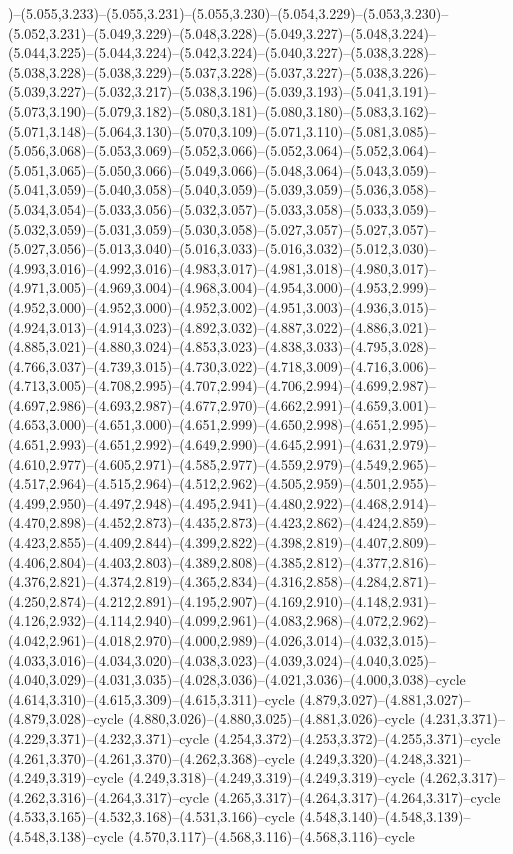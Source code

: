 )--(5.055,3.233)--(5.055,3.231)--(5.055,3.230)--(5.054,3.229)--(5.053,3.230)--(5.052,3.231)--(5.049,3.229)--(5.048,3.228)--(5.049,3.227)--(5.048,3.224)--(5.044,3.225)--(5.044,3.224)--(5.042,3.224)--(5.040,3.227)--(5.038,3.228)--(5.038,3.228)--(5.038,3.229)--(5.037,3.228)--(5.037,3.227)--(5.038,3.226)--(5.039,3.227)--(5.032,3.217)--(5.038,3.196)--(5.039,3.193)--(5.041,3.191)--(5.073,3.190)--(5.079,3.182)--(5.080,3.181)--(5.080,3.180)--(5.083,3.162)--(5.071,3.148)--(5.064,3.130)--(5.070,3.109)--(5.071,3.110)--(5.081,3.085)--(5.056,3.068)--(5.053,3.069)--(5.052,3.066)--(5.052,3.064)--(5.052,3.064)--(5.051,3.065)--(5.050,3.066)--(5.049,3.066)--(5.048,3.064)--(5.043,3.059)--(5.041,3.059)--(5.040,3.058)--(5.040,3.059)--(5.039,3.059)--(5.036,3.058)--(5.034,3.054)--(5.033,3.056)--(5.032,3.057)--(5.033,3.058)--(5.033,3.059)--(5.032,3.059)--(5.031,3.059)--(5.030,3.058)--(5.027,3.057)--(5.027,3.057)--(5.027,3.056)--(5.013,3.040)--(5.016,3.033)--(5.016,3.032)--(5.012,3.030)--(4.993,3.016)--(4.992,3.016)--(4.983,3.017)--(4.981,3.018)--(4.980,3.017)--(4.971,3.005)--(4.969,3.004)--(4.968,3.004)--(4.954,3.000)--(4.953,2.999)--(4.952,3.000)--(4.952,3.000)--(4.952,3.002)--(4.951,3.003)--(4.936,3.015)--(4.924,3.013)--(4.914,3.023)--(4.892,3.032)--(4.887,3.022)--(4.886,3.021)--(4.885,3.021)--(4.880,3.024)--(4.853,3.023)--(4.838,3.033)--(4.795,3.028)--(4.766,3.037)--(4.739,3.015)--(4.730,3.022)--(4.718,3.009)--(4.716,3.006)--(4.713,3.005)--(4.708,2.995)--(4.707,2.994)--(4.706,2.994)--(4.699,2.987)--(4.697,2.986)--(4.693,2.987)--(4.677,2.970)--(4.662,2.991)--(4.659,3.001)--(4.653,3.000)--(4.651,3.000)--(4.651,2.999)--(4.650,2.998)--(4.651,2.995)--(4.651,2.993)--(4.651,2.992)--(4.649,2.990)--(4.645,2.991)--(4.631,2.979)--(4.610,2.977)--(4.605,2.971)--(4.585,2.977)--(4.559,2.979)--(4.549,2.965)--(4.517,2.964)--(4.515,2.964)--(4.512,2.962)--(4.505,2.959)--(4.501,2.955)--(4.499,2.950)--(4.497,2.948)--(4.495,2.941)--(4.480,2.922)--(4.468,2.914)--(4.470,2.898)--(4.452,2.873)--(4.435,2.873)--(4.423,2.862)--(4.424,2.859)--(4.423,2.855)--(4.409,2.844)--(4.399,2.822)--(4.398,2.819)--(4.407,2.809)--(4.406,2.804)--(4.403,2.803)--(4.389,2.808)--(4.385,2.812)--(4.377,2.816)--(4.376,2.821)--(4.374,2.819)--(4.365,2.834)--(4.316,2.858)--(4.284,2.871)--(4.250,2.874)--(4.212,2.891)--(4.195,2.907)--(4.169,2.910)--(4.148,2.931)--(4.126,2.932)--(4.114,2.940)--(4.099,2.961)--(4.083,2.968)--(4.072,2.962)--(4.042,2.961)--(4.018,2.970)--(4.000,2.989)--(4.026,3.014)--(4.032,3.015)--(4.033,3.016)--(4.034,3.020)--(4.038,3.023)--(4.039,3.024)--(4.040,3.025)--(4.040,3.029)--(4.031,3.035)--(4.028,3.036)--(4.021,3.036)--(4.000,3.038)--cycle (4.614,3.310)--(4.615,3.309)--(4.615,3.311)--cycle (4.879,3.027)--(4.881,3.027)--(4.879,3.028)--cycle (4.880,3.026)--(4.880,3.025)--(4.881,3.026)--cycle (4.231,3.371)--(4.229,3.371)--(4.232,3.371)--cycle (4.254,3.372)--(4.253,3.372)--(4.255,3.371)--cycle (4.261,3.370)--(4.261,3.370)--(4.262,3.368)--cycle (4.249,3.320)--(4.248,3.321)--(4.249,3.319)--cycle (4.249,3.318)--(4.249,3.319)--(4.249,3.319)--cycle (4.262,3.317)--(4.262,3.316)--(4.264,3.317)--cycle (4.265,3.317)--(4.264,3.317)--(4.264,3.317)--cycle (4.533,3.165)--(4.532,3.168)--(4.531,3.166)--cycle (4.548,3.140)--(4.548,3.139)--(4.548,3.138)--cycle (4.570,3.117)--(4.568,3.116)--(4.568,3.116)--cycle 
